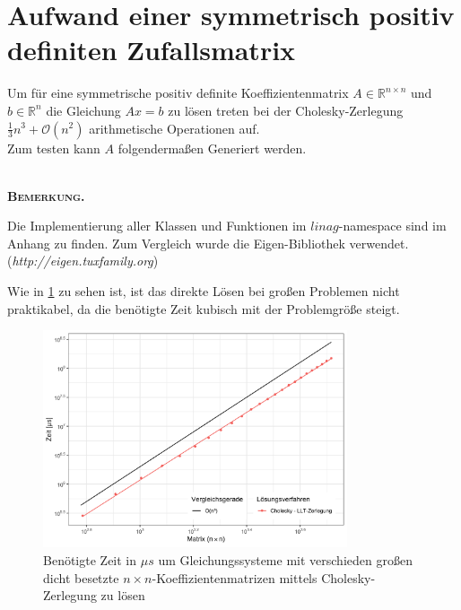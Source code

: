 \documentclass[12pt,a4paper]{scrartcl}
\numberwithin{equation}{section}
\numberwithin{myalgctr}{section}
\numberwithin{mytheoremctr}{subsection}
\numberwithin{mykorollarctr}{subsection}
\numberwithin{mylemmactr}{subsection}
\numberwithin{mybeispielctr}{subsection}
\newenvironment{bemerkung}{%
	\bigskip\noindent%
	\textsc{\textbf{\\Bemerkung.}}%
	\indent
}{\par\bigskip}  %
\begin{document}
	\section{Aufwand einer symmetrisch positiv definiten Zufallsmatrix}
	Um für eine symmetrische positiv definite Koeffizientenmatrix $A\in\mathbb{R}^{n\times n}$ und $b \in \mathbb{R}^{n}$ die Gleichung $Ax = b$ zu lösen treten bei der Cholesky-Zerlegung $\frac{1}{3}n^{3} + \mathcal{O}(n^{2})$ arithmetische Operationen auf. \\
	Zum testen kann $A$ folgendermaßen Generiert werden. 
	
	
	 
	
	\begin{bemerkung}
		Die Implementierung aller Klassen und Funktionen im $linag$-namespace sind im Anhang zu finden. Zum Vergleich wurde die Eigen-Bibliothek verwendet. (\textit{http://eigen.tuxfamily.org}) 
	\end{bemerkung}
	
	Wie in \cref{fig:zeiteigensolver} zu sehen ist, ist das direkte Lösen bei großen Problemen nicht praktikabel, da die benötigte Zeit kubisch mit der Problemgröße steigt. 
	
	\begin{figure}[H]
		\begin{center}
			\includegraphics[width=0.8\textwidth]{../plots/eigen.png}
		\end{center}
		\caption{Ben\"otigte Zeit in $\mu s$ um Gleichungssysteme mit verschieden gro\ss en dicht besetzte $n\times n$-Koeffizientenmatrizen mittels Cholesky-Zerlegung zu l\"osen}
		\label{fig:zeiteigensolver}	
	\end{figure}
	
\end{document}
